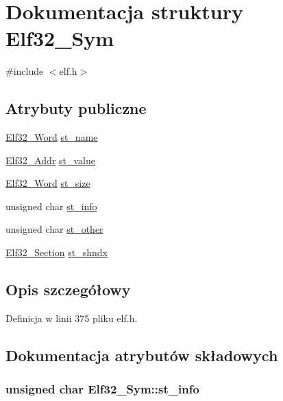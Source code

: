 \hypertarget{struct_elf32___sym}{\section{Dokumentacja struktury Elf32\-\_\-\-Sym}
\label{struct_elf32___sym}
}


{\ttfamily \#include $<$elf.\-h$>$}

\subsection*{Atrybuty publiczne}
\begin{DoxyCompactItemize}
\item 
\hyperlink{elf_8h_af5924ece606c732e86f8263a19408e45}{Elf32\-\_\-\-Word} \hyperlink{struct_elf32___sym_a6a972b30868879f8a1e071e0c45e5031}{st\-\_\-name}
\item 
\hyperlink{elf_8h_a40c6d4571e6001f443cc6a6474620158}{Elf32\-\_\-\-Addr} \hyperlink{struct_elf32___sym_abf8ff76884bc5e2acb5f7eb42f733c2e}{st\-\_\-value}
\item 
\hyperlink{elf_8h_af5924ece606c732e86f8263a19408e45}{Elf32\-\_\-\-Word} \hyperlink{struct_elf32___sym_a1b410e69fecd2610bc7e58d2b0245053}{st\-\_\-size}
\item 
unsigned char \hyperlink{struct_elf32___sym_a7d131c44ec48708b1c98f9b00ca9d528}{st\-\_\-info}
\item 
unsigned char \hyperlink{struct_elf32___sym_a2e1bf6bedb5180f74ea8cbaf9cedfd36}{st\-\_\-other}
\item 
\hyperlink{elf_8h_abaffe34cd8a7e31c8f57ebf85c17ca34}{Elf32\-\_\-\-Section} \hyperlink{struct_elf32___sym_abfa99b2ee1f5f6dbc5d5d348e753a7cb}{st\-\_\-shndx}
\end{DoxyCompactItemize}


\subsection{Opis szczegółowy}


Definicja w linii 375 pliku elf.\-h.



\subsection{Dokumentacja atrybutów składowych}
\hypertarget{struct_elf32___sym_a7d131c44ec48708b1c98f9b00ca9d528}{
\subsubsection[{st\-\_\-info}]{\setlength{\rightskip}{0pt plus 5cm}unsigned char Elf32\-\_\-\-Sym\-::st\-\_\-info}}\label{struct_elf32___sym_a7d131c44ec48708b1c98f9b00ca9d528}


